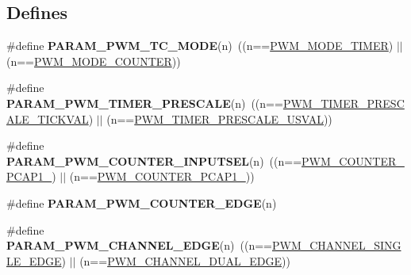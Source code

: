 \subsection*{\-Defines}
\begin{DoxyCompactItemize}
\item 
\hypertarget{group___p_w_m___public___types_ga55215aca36ef6b3d766711c4d48bec8e}{\#define {\bfseries \-P\-A\-R\-A\-M\-\_\-\-P\-W\-M\-\_\-\-T\-C\-\_\-\-M\-O\-D\-E}(n)~((n==\hyperlink{group___p_w_m___public___types_ggae87a42c62d2f49cd3f54d2835a6e1446a739900357b775a3e1b5b50a3ebaca7ce}{\-P\-W\-M\-\_\-\-M\-O\-D\-E\-\_\-\-T\-I\-M\-E\-R}) $|$$|$ (n==\hyperlink{group___p_w_m___public___types_ggae87a42c62d2f49cd3f54d2835a6e1446add660021612a2f19b863bc6498a5cd69}{\-P\-W\-M\-\_\-\-M\-O\-D\-E\-\_\-\-C\-O\-U\-N\-T\-E\-R}))}\label{group___p_w_m___public___types_ga55215aca36ef6b3d766711c4d48bec8e}

\item 
\hypertarget{group___p_w_m___public___types_gab121a6abfa6f7b20e53bb1b43341e862}{\#define {\bfseries \-P\-A\-R\-A\-M\-\_\-\-P\-W\-M\-\_\-\-T\-I\-M\-E\-R\-\_\-\-P\-R\-E\-S\-C\-A\-L\-E}(n)~((n==\hyperlink{group___p_w_m___public___types_gga76c67746a7dc431e243e5d8cf8859b0cad4f3d25b7dd87840d58758a4142eebd4}{\-P\-W\-M\-\_\-\-T\-I\-M\-E\-R\-\_\-\-P\-R\-E\-S\-C\-A\-L\-E\-\_\-\-T\-I\-C\-K\-V\-A\-L}) $|$$|$ (n==\hyperlink{group___p_w_m___public___types_gga76c67746a7dc431e243e5d8cf8859b0caf27d9d800148dd203da235faa6029200}{\-P\-W\-M\-\_\-\-T\-I\-M\-E\-R\-\_\-\-P\-R\-E\-S\-C\-A\-L\-E\-\_\-\-U\-S\-V\-A\-L}))}\label{group___p_w_m___public___types_gab121a6abfa6f7b20e53bb1b43341e862}

\item 
\hypertarget{group___p_w_m___public___types_gaee51ee3268e01741d0f2f4a875c826ff}{\#define {\bfseries \-P\-A\-R\-A\-M\-\_\-\-P\-W\-M\-\_\-\-C\-O\-U\-N\-T\-E\-R\-\_\-\-I\-N\-P\-U\-T\-S\-E\-L}(n)~((n==\hyperlink{group___p_w_m___public___types_ggad89b9a422688a938a102b4b6b55c48a3a55cda1ed5c79e14534e7d756f37d602d}{\-P\-W\-M\-\_\-\-C\-O\-U\-N\-T\-E\-R\-\_\-\-P\-C\-A\-P1\-\_}) $|$$|$ (n==\hyperlink{group___p_w_m___public___types_ggad89b9a422688a938a102b4b6b55c48a3a62bcb23edfcaef345a952de63613544d}{\-P\-W\-M\-\_\-\-C\-O\-U\-N\-T\-E\-R\-\_\-\-P\-C\-A\-P1\-\_}))}\label{group___p_w_m___public___types_gaee51ee3268e01741d0f2f4a875c826ff}

\item 
\#define {\bfseries \-P\-A\-R\-A\-M\-\_\-\-P\-W\-M\-\_\-\-C\-O\-U\-N\-T\-E\-R\-\_\-\-E\-D\-G\-E}(n)
\item 
\hypertarget{group___p_w_m___public___types_gad57cff09f2f1bb28922ea9de62e1cb6b}{\#define {\bfseries \-P\-A\-R\-A\-M\-\_\-\-P\-W\-M\-\_\-\-C\-H\-A\-N\-N\-E\-L\-\_\-\-E\-D\-G\-E}(n)~((n==\hyperlink{group___p_w_m___public___types_gga4a602b4545cc4282b42128e10fbee114a812daae4a50ee180115855eabfbc5d85}{\-P\-W\-M\-\_\-\-C\-H\-A\-N\-N\-E\-L\-\_\-\-S\-I\-N\-G\-L\-E\-\_\-\-E\-D\-G\-E}) $|$$|$ (n==\hyperlink{group___p_w_m___public___types_gga4a602b4545cc4282b42128e10fbee114a332cb30b88c9fe1b51bad0ae93726b2f}{\-P\-W\-M\-\_\-\-C\-H\-A\-N\-N\-E\-L\-\_\-\-D\-U\-A\-L\-\_\-\-E\-D\-G\-E}))}\label{group___p_w_m___public___types_gad57cff09f2f1bb28922ea9de62e1cb6b}


\end{DoxyCompactItemize}
